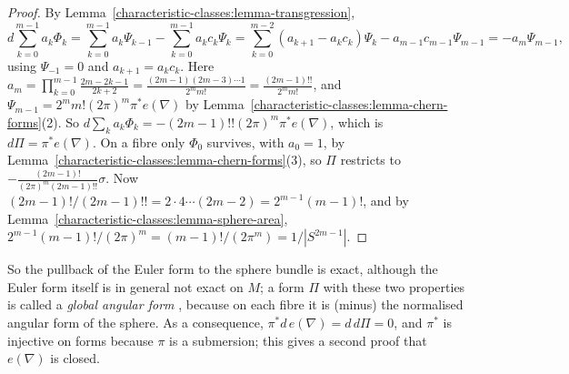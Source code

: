 \begin{proof}
By Lemma~\ref{characteristic-classes:lemma-transgression},
\[
d\sum_{k=0}^{m-1}a_k\Phi_k = \sum_{k=0}^{m-1}a_k\Psi_{k-1} - \sum_{k=0}^{m-1}a_kc_k\Psi_k = \sum_{k=0}^{m-2}(a_{k+1} - a_kc_k)\Psi_k - a_{m-1}c_{m-1}\Psi_{m-1} = -a_m\Psi_{m-1},
\]
using $\Psi_{-1} = 0$ and $a_{k+1} = a_kc_k$. Here
$a_m = \prod_{k=0}^{m-1}\frac{2m-2k-1}{2k+2} = \frac{(2m-1)(2m-3) \cdots 1}{2^mm!} = \frac{(2m-1)!!}{2^mm!}$, and $\Psi_{m-1} = 2^mm!(2\pi)^m\pi^*e(\nabla)$ by
Lemma~\ref{characteristic-classes:lemma-chern-forms}(2). So $d\sum_ka_k\Phi_k = -(2m-1)!!(2\pi)^m\pi^*e(\nabla)$, which is $d\Pi = \pi^*e(\nabla)$. On a fibre only $\Phi_0$ survives, with
$a_0 = 1$, by Lemma~\ref{characteristic-classes:lemma-chern-forms}(3), so $\Pi$ restricts to $-\frac{(2m-1)!}{(2\pi)^m(2m-1)!!}\sigma$. Now $(2m-1)!/(2m-1)!! = 2 \cdot 4 \cdots (2m-2) = 2^{m-1}(m-1)!$,
and by Lemma~\ref{characteristic-classes:lemma-sphere-area},
$2^{m-1}(m-1)!/(2\pi)^m = (m-1)!/(2\pi^m) = 1/|S^{2m-1}|$.
\end{proof}

So the pullback of the Euler form to the sphere bundle is exact, although the Euler form itself is in general not exact on $M$; a form $\Pi$ with these two properties is called a
\emph{global angular form} \cite[Section 11]{bott-tu}, because on each fibre it is (minus) the normalised angular form of the sphere. As a consequence, $\pi^*d\,e(\nabla) = d\,d\Pi = 0$, and
$\pi^*$ is injective on forms because $\pi$ is a submersion; this gives a second proof that $e(\nabla)$ is closed.

